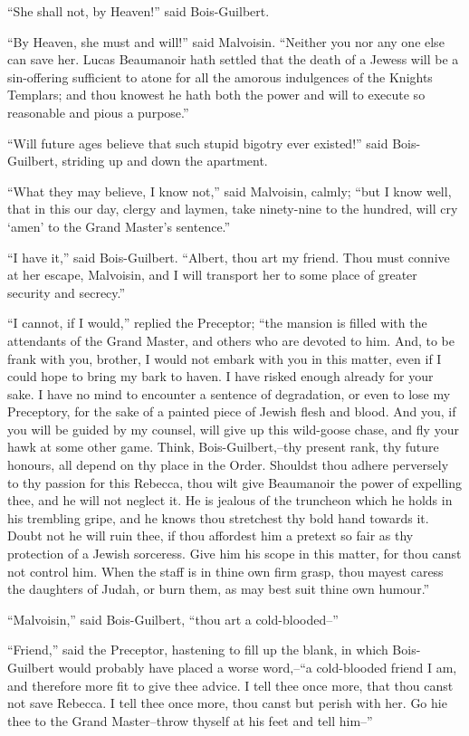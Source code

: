 ``She shall not, by Heaven!'' said Bois-Guilbert.

``By Heaven, she must and will!'' said Malvoisin. ``Neither you nor any
one else can save her. Lucas Beaumanoir hath settled that the death of a
Jewess will be a sin-offering sufficient to atone for all the amorous
indulgences of the Knights Templars; and thou knowest he hath both the
power and will to execute so reasonable and pious a purpose.''

``Will future ages believe that such stupid bigotry ever existed!'' said
Bois-Guilbert, striding up and down the apartment.

``What they may believe, I know not,'' said Malvoisin, calmly; ``but I
know well, that in this our day, clergy and laymen, take ninety-nine to
the hundred, will cry `amen' to the Grand Master's sentence.''

``I have it,'' said Bois-Guilbert. ``Albert, thou art my friend. Thou
must connive at her escape, Malvoisin, and I will transport her to some
place of greater security and secrecy.''

``I cannot, if I would,'' replied the Preceptor; ``the mansion is filled
with the attendants of the Grand Master, and others who are devoted to
him. And, to be frank with you, brother, I would not embark with you in
this matter, even if I could hope to bring my bark to haven. I have
risked enough already for your sake. I have no mind to encounter a
sentence of degradation, or even to lose my Preceptory, for the sake of
a painted piece of Jewish flesh and blood. And you, if you will be
guided by my counsel, will give up this wild-goose chase, and fly your
hawk at some other game. Think, Bois-Guilbert,--thy present rank, thy
future honours, all depend on thy place in the Order. Shouldst thou
adhere perversely to thy passion for this Rebecca, thou wilt give
Beaumanoir the power of expelling thee, and he will not neglect it. He
is jealous of the truncheon which he holds in his trembling gripe, and
he knows thou stretchest thy bold hand towards it. Doubt not he will
ruin thee, if thou affordest him a pretext so fair as thy protection of
a Jewish sorceress. Give him his scope in this matter, for thou canst
not control him. When the staff is in thine own firm grasp, thou mayest
caress the daughters of Judah, or burn them, as may best suit thine own
humour.''

``Malvoisin,'' said Bois-Guilbert, ``thou art a cold-blooded--''

``Friend,'' said the Preceptor, hastening to fill up the blank, in which
Bois-Guilbert would probably have placed a worse word,--``a cold-blooded
friend I am, and therefore more fit to give thee advice. I tell thee
once more, that thou canst not save Rebecca. I tell thee once more, thou
canst but perish with her. Go hie thee to the Grand Master--throw
thyself at his feet and tell him--''

